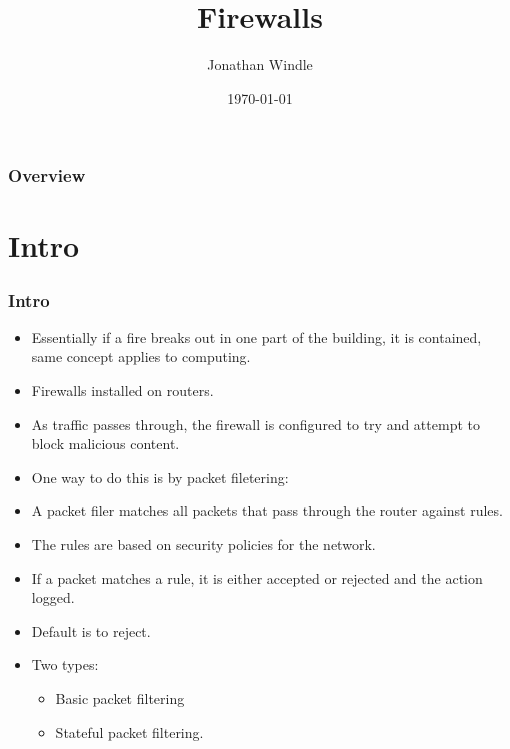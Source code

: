 \documentclass{beamer}
\title[Firewalls]{Firewalls} %
\author{Jonathan Windle} %
\institute[UEA] %
{
University of East Anglia \\ %
\medskip
\textit{J.Windle@uea.ac.uk} %
}
\date{\today} %
\begin{document}
\begin{frame}
\titlepage %
\end{frame}

\begin{frame}[allowframebreaks]
\frametitle{Overview} %
\tableofcontents %
\end{frame}

\section{Intro}
\begin{frame}
\frametitle{Intro}
\begin{itemize}
\item Essentially if a fire breaks out in one part of the building, it is contained, same concept applies to computing.
\item Firewalls installed on routers.
\item As traffic passes through, the firewall is configured to try and attempt to block malicious content.
\item One way to do this is by packet filetering:
\item A packet filer matches all packets that pass through the router against rules.
\item The rules are based on security policies for the network.
\item If a packet matches a rule, it is either accepted or rejected and the action logged.
\item Default is to reject.
\item Two types:
\begin{itemize}
\item Basic packet filtering
\item Stateful packet filtering.
\end{itemize}
\end{itemize}
\end{frame}
\end{document}
